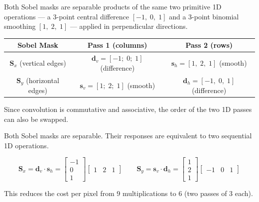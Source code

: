 \documentclass[12pt]{article}
\begin{document}
\begin{stepbox}
Both Sobel masks are separable products of the same two primitive 1D operations --- a 3-point central difference $[-1,\; 0,\; 1]$ and a 3-point binomial smoothing $[1,\; 2,\; 1]$ --- applied in perpendicular directions.

\begin{center}
\renewcommand{\arraystretch}{1.3}
\begin{tabular}{|c|c|c|}
\hline
\textbf{Sobel Mask} & \textbf{Pass 1 (columns)} & \textbf{Pass 2 (rows)} \\
\hline
$\mathbf{S}_x$ (vertical edges) & $\mathbf{d}_v = [-1;\; 0;\; 1]$ (difference) & $\mathbf{s}_h = [1,\; 2,\; 1]$ (smooth) \\
\hline
$\mathbf{S}_y$ (horizontal edges) & $\mathbf{s}_v = [1;\; 2;\; 1]$ (smooth) & $\mathbf{d}_h = [-1,\; 0,\; 1]$ (difference) \\
\hline
\end{tabular}
\end{center}

Since convolution is commutative and associative, the order of the two 1D passes can also be swapped.
\end{stepbox}

\begin{resultsbox}
Both Sobel masks are separable. Their responses are equivalent to two sequential 1D operations.

\[
\boxed{\mathbf{S}_x = \mathbf{d}_v \cdot \mathbf{s}_h =
\begin{bmatrix} -1 \\ 0 \\ 1 \end{bmatrix}
\begin{bmatrix} 1 & 2 & 1 \end{bmatrix}}
\qquad
\boxed{\mathbf{S}_y = \mathbf{s}_v \cdot \mathbf{d}_h =
\begin{bmatrix} 1 \\ 2 \\ 1 \end{bmatrix}
\begin{bmatrix} -1 & 0 & 1 \end{bmatrix}}
\]

This reduces the cost per pixel from 9 multiplications to 6 (two passes of 3 each).
\end{resultsbox}


\end{document}
